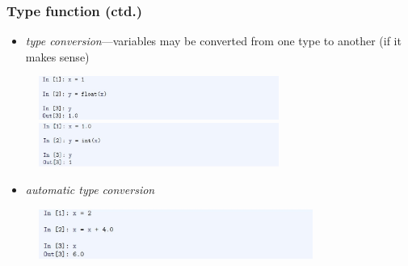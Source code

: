 \documentclass[english,14pt]{beamer}
\newcommand\red[1]{{\color{red} #1}}
\begin{document}
\begin{frame}[fragile]

\frametitle{Type function (ctd.)}

\vspace*{-3mm}
\begin{itemize}
	\item \red{\emph{type conversion}}---variables may be converted from one type to another (if it makes sense)
\end{itemize}
\vspace*{-3mm}
\begin{figure}[ht]
	\centering
	\includegraphics[width=0.7\textwidth]{figures/LLp43b}
	\includegraphics[width=0.7\textwidth]{figures/LLp43c}
\end{figure}

\begin{itemize}
	\item \red{\emph{automatic type conversion}}
\end{itemize}
\vspace*{-3mm}
\begin{figure}[ht]
	\centering
	\includegraphics[width=0.8\textwidth]{figures/LLp43d}
\end{figure}

\end{frame}

%
%
%
%
%
%
%
\end{document}
